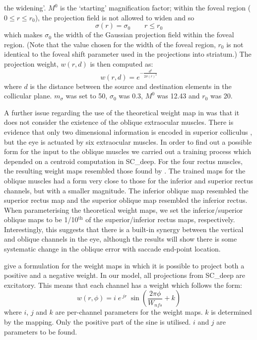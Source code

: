 \documentclass{frontiersSCNS}
\begin{document}
the widening'. $M^0$ is the `starting' magnification factor; within
the foveal region ($0 \leq r \leq r_0$), the projection field is not
allowed to widen and so
\begin{equation} \label{eq:sigmar2}
\sigma(r) = \sigma_0 \qquad r \leq r_0
\end{equation}
which makes $\sigma_0$ the width of the Gaussian projection field
within the foveal region. (Note that the value chosen for the width of
the foveal region, $r_0$ is not identical to the foveal shift
parameter used in the  projections into striatum.)
The  projection weight, $w(r,d)$ is then computed
as:
\begin{equation} \label{eq:widening}
w(r,d) = e^{-\frac{d^2}{2\sigma\left(r\right)^2}}
\end{equation}
where $d$ is the distance between the source and destination elements
in the collicular plane.  $m_\sigma$ was set to 50, $\sigma_0$ was
0.3, $M^0$ was 12.43 and $r_0$ was 20.

A further issue regarding the use of the theoretical weight map
in \cite{tabareau_geometry_2007} was that it does not consider the
existence of the oblique extraocular muscles. There is evidence that
only two dimensional information is encoded in superior
colliculus
\citep{wurtz_activity_1972,hepp_monkey_1993,van_opstal_two-rather_1991},
but the eye is actuated by six extraocular muscles. In order to find
out a possible form for the input to the oblique muscles we carried
out a training process
which depended on a centroid computation in SC\_deep. For the four
rectus muscles, the resulting weight maps resembled those found by
\cite{arai_two-dimensional_1994}. The trained
maps for the oblique muscles had a form very close to those for the
inferior and superior rectus channels, but with a smaller magnitude.
The inferior oblique map resembled the superior rectus map and the
superior oblique map resembled the inferior rectus. When parameterising
the theoretical weight maps, we set the inferior/superior
oblique maps to be 1/10$^{\mathrm{th}}$ of the superior/inferior rectus
maps, respectively. Interestingly, this suggests that there is a built-in
synergy between the vertical and oblique channels in the eye, although
the results will show there is some systematic change in the oblique error
with saccade end-point location.

\cite{tabareau_geometry_2007} give a formulation for the weight maps
in which it is possible to project both a positive and a negative
weight. In our model, all projections from SC\_deep are excitatory.
This means that each channel has a weight which follows the form:
\begin{equation} \label{eq:weightmaps}
w(r,\phi) = i\;e\,^{jr}\;\sin\left(\frac{2\pi\phi}{W_{nfs}} + k\right)
\end{equation}
where $i$, $j$ and $k$ are per-channel parameters for the weight
maps. $k$ is determined by the mapping. Only the positive part of the
sine is utilised. $i$ and $j$ are parameters to be found.
\end{document}
